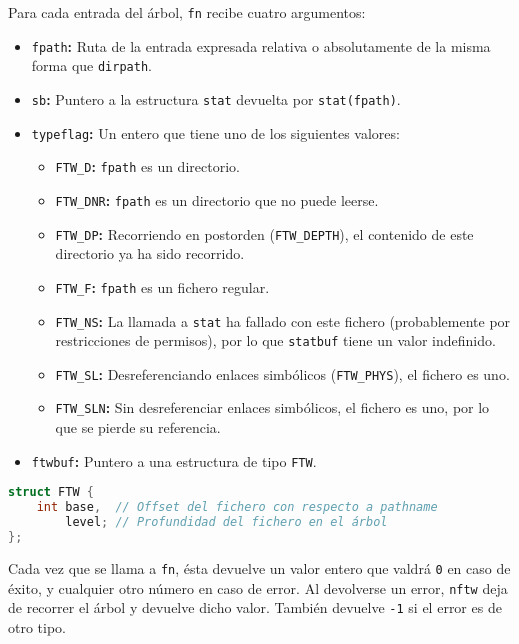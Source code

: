 Para cada entrada del árbol, \texttt{fn} recibe cuatro argumentos:

\begin{itemize}
	\item\texttt{fpath}\textbf{:} Ruta de la entrada expresada relativa o absolutamente de la misma forma que \texttt{dirpath}.
	\item\texttt{sb}\textbf{:} Puntero a la estructura \texttt{stat} devuelta por \texttt{stat(fpath)}.
	\item\texttt{typeflag}\textbf{:} Un entero que tiene uno de los siguientes valores:
	\begin{itemize}
		\item\texttt{FTW\_D}\textbf{:} \texttt{fpath} es un directorio.
		\item\texttt{FTW\_DNR}\textbf{:} \texttt{fpath} es un directorio que no puede leerse.
		\item\texttt{FTW\_DP}\textbf{:} Recorriendo en postorden (\texttt{FTW\_DEPTH}), el contenido de este directorio ya ha sido recorrido.
		\item\texttt{FTW\_F}\textbf{:} \texttt{fpath} es un fichero regular.
		\item\texttt{FTW\_NS}\textbf{:} La llamada a \texttt{stat} ha fallado con este fichero (probablemente por restricciones de permisos), por lo que \texttt{statbuf} tiene un valor indefinido.
		\item\texttt{FTW\_SL}\textbf{:} Desreferenciando enlaces simbólicos (\texttt{FTW\_PHYS}), el fichero es uno.
		\item\texttt{FTW\_SLN}\textbf{:} Sin desreferenciar enlaces simbólicos, el fichero es uno, por lo que se pierde su referencia.
	\end{itemize}
	\item\texttt{ftwbuf}\textbf{:} Puntero a una estructura de tipo \texttt{FTW}.
\end{itemize}

\begin{lstlisting}[language=C]
struct FTW {
	int base,  // Offset del fichero con respecto a pathname
	    level; // Profundidad del fichero en el árbol
};
\end{lstlisting}

Cada vez que se llama a \texttt{fn}, ésta devuelve un valor entero que valdrá \texttt{0} en caso de éxito, y cualquier otro número en caso de error.
Al devolverse un error, \texttt{nftw} deja de recorrer el árbol y devuelve dicho valor.
También devuelve \texttt{-1} si el error es de otro tipo.

